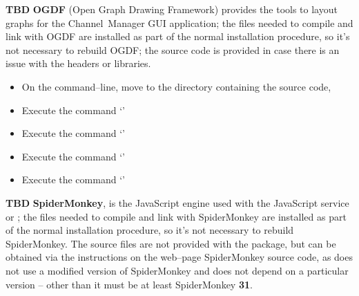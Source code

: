 \tertiaryEnd{}
\textbf{TBD}
\tertiaryEnd{}
\secondaryEnd{}
\textbf{OGDF} (Open Graph Drawing Framework) provides the tools to layout graphs for the
Channel~Manager GUI application; the files needed to compile and link with OGDF are
installed as part of the normal \mplusm{} installation procedure, so it's not necessary to
rebuild OGDF; the source code is provided in case there is an issue with the headers or
libraries.
\begin{itemize}
\item On the command--line, move to the directory containing the \mplusm{} source code,
\item Execute the command `'
\item Execute the command `'
\item Execute the command `'
\item Execute the command `'
\end{itemize}
\tertiaryEnd{}
\textbf{TBD}
\tertiaryEnd{}
\secondaryEnd{}
\textbf{SpiderMonkey}, is the JavaScript engine used with the JavaScript service or
\mplusm{}; the files needed to compile and link with SpiderMonkey are installed as part of
the normal \mplusm{} installation procedure, so it's not necessary to rebuild
SpiderMonkey.
The source files are not provided with the  package, but can be obtained
via the instructions on the web--page
%
{SpiderMonkey source code}, as \mplusm{} does not use a modified version of SpiderMonkey
and does not depend on a particular version -- other than it must be at least SpiderMonkey
\textbf{31}.
